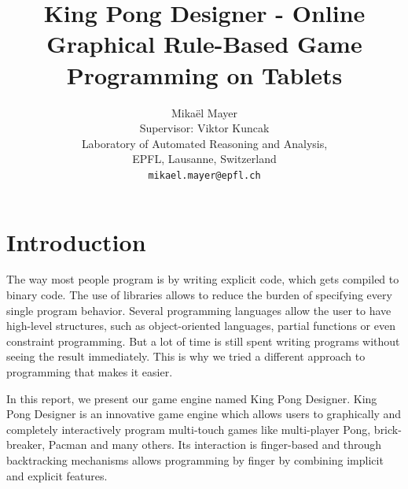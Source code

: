 \documentclass[12pt]{article} %
\title{King Pong Designer - Online Graphical Rule-Based Game Programming on
Tablets}
\author{Mikaël Mayer \\
   Supervisor: Viktor Kuncak \\
   Laboratory of Automated Reasoning and Analysis,\\
   EPFL, Lausanne, Switzerland \\
   \texttt{mikael.mayer@epfl.ch}}
\begin{document}
\maketitle
{}

\section{Introduction}

The way most people program is by writing explicit code,
which gets compiled to binary code. The use of libraries allows to reduce the
burden of specifying every single program behavior. Several programming
languages allow the user to have high-level structures, such as object-oriented
languages, partial functions or even constraint programming. But a lot of time
is still spent writing programs without seeing the result immediately. This is
why we tried a different approach to programming that makes it easier.

In this report, we present our game engine named King Pong Designer.
King Pong Designer is an innovative game engine which allows users to
graphically and completely interactively program multi-touch games like
multi-player Pong, brick-breaker, Pacman and many others. Its interaction is
finger-based and through backtracking mechanisms allows programming by finger
by combining implicit and explicit features.
\end{document}
